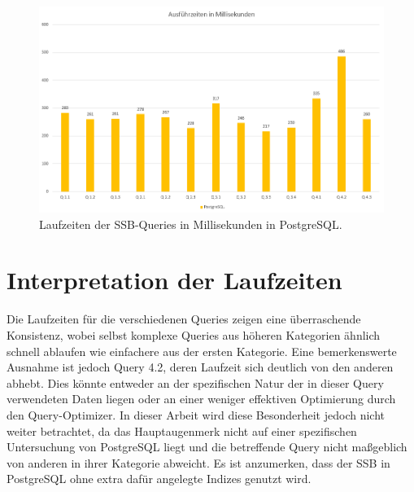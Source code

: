 \begin{figure}[ht]  %
    \centering      %
    \includegraphics[width=1\textwidth]{pictures/results/results-postgres.png}
    \caption{Laufzeiten der SSB-Queries in Millisekunden in PostgreSQL.}      %
    \label{pic:results-denormalized}    %
\end{figure}

\newpage
\section{Interpretation der Laufzeiten}
Die Laufzeiten für die verschiedenen Queries zeigen eine überraschende Konsistenz, wobei selbst komplexe Queries aus höheren Kategorien ähnlich schnell ablaufen wie einfachere aus der ersten Kategorie. Eine bemerkenswerte Ausnahme ist jedoch Query 4.2, deren Laufzeit sich deutlich von den anderen abhebt. Dies könnte entweder an der spezifischen Natur der in dieser Query verwendeten Daten liegen oder an einer weniger effektiven Optimierung durch den Query-Optimizer. In dieser Arbeit wird diese Besonderheit jedoch nicht weiter betrachtet, da das Hauptaugenmerk nicht auf einer spezifischen Untersuchung von PostgreSQL liegt und die betreffende Query nicht maßgeblich von anderen in ihrer Kategorie abweicht.
Es ist anzumerken, dass der SSB in PostgreSQL ohne extra dafür angelegte Indizes genutzt wird.